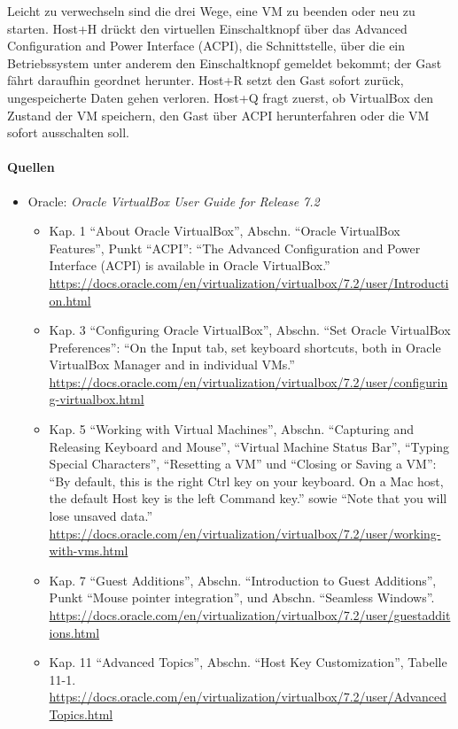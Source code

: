 Leicht zu verwechseln sind die drei Wege, eine VM zu beenden oder neu zu starten. Host+H drückt den virtuellen Einschaltknopf über das Advanced Configuration and Power Interface (ACPI), die Schnittstelle, über die ein Betriebssystem unter anderem den Einschaltknopf gemeldet bekommt; der Gast fährt daraufhin geordnet herunter. Host+R setzt den Gast sofort zurück, ungespeicherte Daten gehen verloren. Host+Q fragt zuerst, ob VirtualBox den Zustand der VM speichern, den Gast über ACPI herunterfahren oder die VM sofort ausschalten soll.

\paragraph{Quellen}
\begin{itemize}[quellen]
  \item Oracle: \emph{Oracle VirtualBox User Guide for Release 7.2}
  \begin{itemize}[nosep]
    \item Kap. 1 \enquote{About Oracle VirtualBox}, Abschn. \enquote{Oracle VirtualBox Features}, Punkt \enquote{ACPI}: \enquote{The Advanced Configuration and Power Interface (ACPI) is available in Oracle VirtualBox.} \url{https://docs.oracle.com/en/virtualization/virtualbox/7.2/user/Introduction.html}
    \item Kap. 3 \enquote{Configuring Oracle VirtualBox}, Abschn. \enquote{Set Oracle VirtualBox Preferences}: \enquote{On the Input tab, set keyboard shortcuts, both in Oracle VirtualBox Manager and in individual VMs.} \url{https://docs.oracle.com/en/virtualization/virtualbox/7.2/user/configuring-virtualbox.html}
    \item Kap. 5 \enquote{Working with Virtual Machines}, Abschn. \enquote{Capturing and Releasing Keyboard and Mouse}, \enquote{Virtual Machine Status Bar}, \enquote{Typing Special Characters}, \enquote{Resetting a VM} und \enquote{Closing or Saving a VM}: \enquote{By default, this is the right Ctrl key on your keyboard. On a Mac host, the default Host key is the left Command key.} sowie \enquote{Note that you will lose unsaved data.} \url{https://docs.oracle.com/en/virtualization/virtualbox/7.2/user/working-with-vms.html}
    \item Kap. 7 \enquote{Guest Additions}, Abschn. \enquote{Introduction to Guest Additions}, Punkt \enquote{Mouse pointer integration}, und Abschn. \enquote{Seamless Windows}. \url{https://docs.oracle.com/en/virtualization/virtualbox/7.2/user/guestadditions.html}
    \item Kap. 11 \enquote{Advanced Topics}, Abschn. \enquote{Host Key Customization}, Tabelle 11-1. \url{https://docs.oracle.com/en/virtualization/virtualbox/7.2/user/AdvancedTopics.html}
  \end{itemize}
\end{itemize}

